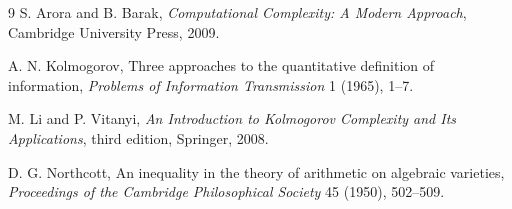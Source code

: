 \documentclass[11pt]{article}
\begin{document}
\begin{thebibliography}{9}
S. Arora and B. Barak,
\emph{Computational Complexity: A Modern Approach},
Cambridge University Press, 2009.

A. N. Kolmogorov,
Three approaches to the quantitative definition of information,
\emph{Problems of Information Transmission} 1 (1965), 1--7.

M. Li and P. Vitanyi,
\emph{An Introduction to Kolmogorov Complexity and Its Applications},
third edition, Springer, 2008.

D. G. Northcott,
An inequality in the theory of arithmetic on algebraic varieties,
\emph{Proceedings of the Cambridge Philosophical Society} 45 (1950), 502--509.
\end{thebibliography}
\end{document}
